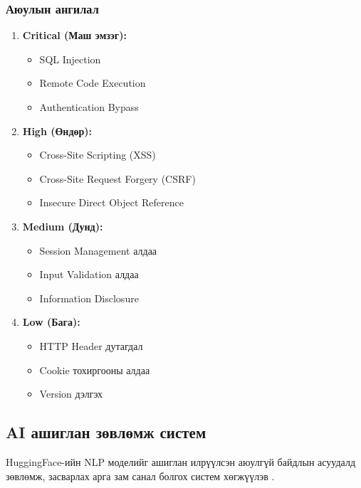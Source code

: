 \documentclass[main.tex]{subfiles}
\begin{document}
\subsubsection{Аюулын ангилал}
\begin{enumerate}
    \item \textbf{Critical (Маш эмзэг):}
    \begin{itemize}
        \item SQL Injection
        \item Remote Code Execution
        \item Authentication Bypass
    \end{itemize}
    
    \item \textbf{High (Өндөр):}
    \begin{itemize}
        \item Cross-Site Scripting (XSS)
        \item Cross-Site Request Forgery (CSRF)
        \item Insecure Direct Object Reference
    \end{itemize}
    
    \item \textbf{Medium (Дунд):}
    \begin{itemize}
        \item Session Management алдаа
        \item Input Validation алдаа
        \item Information Disclosure
    \end{itemize}
    
    \item \textbf{Low (Бага):}
    \begin{itemize}
        \item HTTP Header дутагдал
        \item Cookie тохиргооны алдаа
        \item Version дэлгэх
    \end{itemize}
\end{enumerate}

\subsection{AI ашиглан зөвлөмж систем}

HuggingFace-ийн NLP моделийг ашиглан илрүүлсэн аюулгүй байдлын асуудалд зөвлөмж, засварлах арга зам санал болгох систем хөгжүүлэв \cite{12}.
\end{document}
